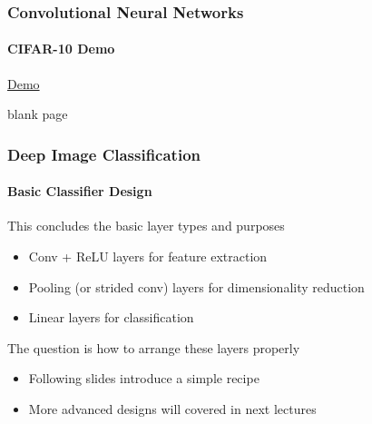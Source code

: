 \documentclass[xetex,professionalfont]{beamer}
\begin{document}
\begin{frame}
\frametitle{Convolutional Neural Networks}
\framesubtitle{CIFAR-10 Demo}

\begin{center}
    {\centering \href{https://cs.stanford.edu/people/karpathy/convnetjs/demo/cifar10.html}{Demo}}
\end{center}

\end{frame}


{
\begin{frame}


\begin{center}
\textcolor[rgb]{0.9,0.9,0.9}{blank page}
\end{center}

\end{frame}
}


\begin{frame}
\frametitle{Deep Image Classification}
\framesubtitle{Basic Classifier Design}

This concludes the basic layer types and purposes %
\begin{itemize}
    \item Conv + ReLU layers for feature extraction
    \item Pooling (or strided conv) layers for dimensionality reduction
    \item Linear layers for classification
\end{itemize}

\bigskip

The question is how to arrange these layers properly
\begin{itemize}
    \item Following slides introduce a simple recipe
    \item More advanced designs will covered in next lectures
\end{itemize}

\end{frame}
\end{document}
